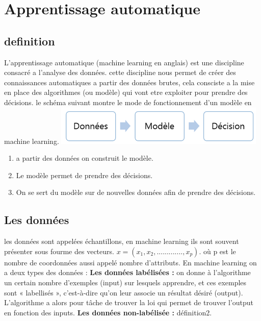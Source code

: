 \documentclass[a4paper,11pt]{report}
\begin{document}
\newpage
\section{Apprentissage automatique}
\subsection*{definition}
L'apprentissage automatique (machine learning en anglais) est une discipline consacré a l'analyse des données. cette discipline nous permet de créer des connaissances automatiques a partir des données brutes, cela consciste a la mise en place des algorithmes (ou modèle) qui vont etre exploiter pour prendre des décisions.\newline
le schéma suivant montre le mode de fonctionnement d'un modèle en machine learning.\newline
\hspace*{4cm}\includegraphics[scale=1]{m_learning.png} 
 \begin{enumerate}
 \item a partir des données on construit le modèle.
 \item Le modèle permet de prendre des décisions.
 \item On se sert du modèle sur de nouvelles données afin de prendre des décisions.
 \end{enumerate}
\subsection{Les données}
les données sont appelées échantillons, en machine learning ils sont souvent présenter sous fourme des vecteurs.\newline
$x=(x_1, x_2,.............,x_p).$\newline
où p est le nombre de coordonnées aussi appelé nombre d’attributs.\newline
En machine learning on a deux types des données :\newline
\newline
\textbf{Les données labélisées :} on donne à l’algorithme un certain nombre d’exemples (input) sur lesquels apprendre, et ces exemples sont « labellisés », c’est-à-dire qu’on leur associe un résultat désiré (output). L’algorithme a alors pour tâche de trouver la loi qui permet de trouver l’output en fonction des inputs.\newline
\newline 
\textbf{Les données non-labélisée :} définition2.
\end{document}
